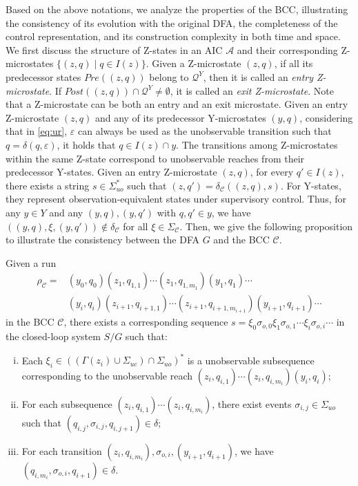 \documentclass[journal,twoside,web]{ieeecolor}
\begin{document}
Based on the above notations, we analyze the properties of the BCC, illustrating the consistency of its evolution with the original DFA, the completeness of the control representation, and its construction complexity in both time and space.
%
We first discuss the structure of Z-states in an AIC $\mathcal{A}$ and their corresponding Z-microstates $\{ (z, q) \mid q \in I(z) \}$.
Given a Z-microstate $(z, q)$, if all its predecessor states $Pre((z,q))$ belong to $\bm{\mathcal{Q}}^Y$, then it is called an \emph{entry Z-microstate}.
If $Post((z,q)) \cap \bm{\mathcal{Q}}^Y \neq \emptyset$, it is called an \emph{exit Z-microstate}.
Note that a Z-microstate can be both an entry and an exit microstate.
%
Given an entry Z-microstate $(z, q)$ and any of its predecessor Y-microstates $(y, q)$, considering that in \eqref{eq:ur}, $\varepsilon$ can always be used as the unobservable transition such that $q = \delta(q, \varepsilon)$, it holds that $q \in I(z) \cap y$.
The transitions among Z-microstates within the same Z-state correspond to unobservable reaches from their predecessor Y-states.
Given an entry Z-microstate $(z, q)$, for every $q' \in I(z)$, there exists a string $s \in \Sigma_{uo}^*$ such that $(z, q') = \delta_{\mathcal{C}}((z, q), s)$.
%
For Y-states, they represent observation-equivalent states under supervisory control.
Thus, for any $y \in Y$ and any $(y, q), (y, q')$ with $q, q' \in y$, we have $((y, q), \xi, (y, q')) \notin \delta_{\mathcal{C}}$ for all $\xi \in \Sigma_{\mathcal{C}}$.
%
Then, we give the following proposition to illustrate the consistency between the DFA $G$ and the BCC $\mathcal{C}$.
%
\begin{proposition}\label{prop:bcc_dfa_consistency}
Given a run 
$$
\begin{aligned}
\rho_{\mathcal{C}} = &(y_0, q_0) (z_1, q_{1,1}) \cdots (z_1, q_{1,m_1}) (y_1, q_1) \cdots \\
                     &(y_i, q_i) (z_{i+1}, q_{i+1,1}) \cdots (z_{i+1}, q_{i+1,m_{i+1}}) (y_{i+1}, q_{i+1}) \cdots
\end{aligned}
$$
in the BCC $\mathcal{C}$, there exists a corresponding sequence
$
s = \xi_0 \sigma_{o,0} \xi_1 \sigma_{o,1} \cdots \xi_i \sigma_{o,i} \cdots
$
in the closed-loop system $S/G$ such that:
\begin{enumerate}[(i)]
    \item Each $\xi_i \in ((\Gamma(z_i) \cup \Sigma_{uc}) \cap \Sigma_{uo})^*$ is a unobservable subsequence corresponding to the unobservable reach $(z_{i}, q_{i,1}) \cdots (z_{i}, q_{i,m_{i}}) (y_{i}, q_{i})$;
    \item For each subsequence $(z_i, q_{i,1}) \cdots (z_i, q_{i,m_i})$, there exist events $\sigma_{i,j} \in \Sigma_{uo}$ such that
    $
    (q_{i,j}, \sigma_{i,j}, q_{i,j+1}) \in \delta;
    $
    \item For each transition $(z_i, q_{i,m_i}), \sigma_{o,i}, (y_{i+1}, q_{i+1})$, we have
    $
    (q_{i,m_i}, \sigma_{o,i}, q_{i+1}) \in \delta.
    $
\end{enumerate}
\end{proposition}
\end{document}
